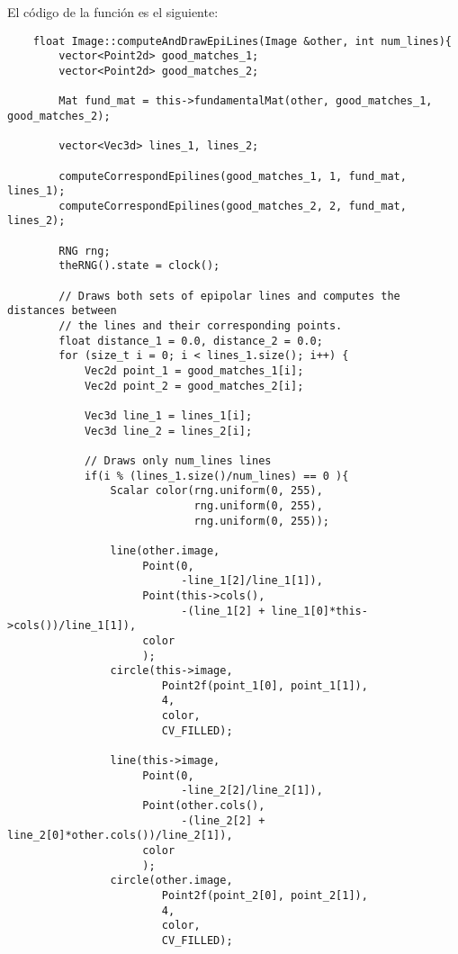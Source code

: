 \documentclass[a4paper, 11pt]{article}
\theoremstyle{definition}
\theoremstyle{theorem}
\begin{document}
    El código de la función es el siguiente:

    \begin{lstlisting}
    float Image::computeAndDrawEpiLines(Image &other, int num_lines){
        vector<Point2d> good_matches_1;
        vector<Point2d> good_matches_2;

        Mat fund_mat = this->fundamentalMat(other, good_matches_1, good_matches_2);

        vector<Vec3d> lines_1, lines_2;

        computeCorrespondEpilines(good_matches_1, 1, fund_mat, lines_1);
        computeCorrespondEpilines(good_matches_2, 2, fund_mat, lines_2);

        RNG rng;
        theRNG().state = clock();

        // Draws both sets of epipolar lines and computes the distances between
        // the lines and their corresponding points.
        float distance_1 = 0.0, distance_2 = 0.0;
        for (size_t i = 0; i < lines_1.size(); i++) {
            Vec2d point_1 = good_matches_1[i];
            Vec2d point_2 = good_matches_2[i];

            Vec3d line_1 = lines_1[i];
            Vec3d line_2 = lines_2[i];

            // Draws only num_lines lines
            if(i % (lines_1.size()/num_lines) == 0 ){
                Scalar color(rng.uniform(0, 255),
                             rng.uniform(0, 255),
                             rng.uniform(0, 255));

                line(other.image,
                     Point(0,
                           -line_1[2]/line_1[1]),
                     Point(this->cols(),
                           -(line_1[2] + line_1[0]*this->cols())/line_1[1]),
                     color
                     );
                circle(this->image,
                        Point2f(point_1[0], point_1[1]),
                        4,
                        color,
                        CV_FILLED);

                line(this->image,
                     Point(0,
                           -line_2[2]/line_2[1]),
                     Point(other.cols(),
                           -(line_2[2] + line_2[0]*other.cols())/line_2[1]),
                     color
                     );
                circle(other.image,
                        Point2f(point_2[0], point_2[1]),
                        4,
                        color,
                        CV_FILLED);


\end{lstlisting}
\end{document}
